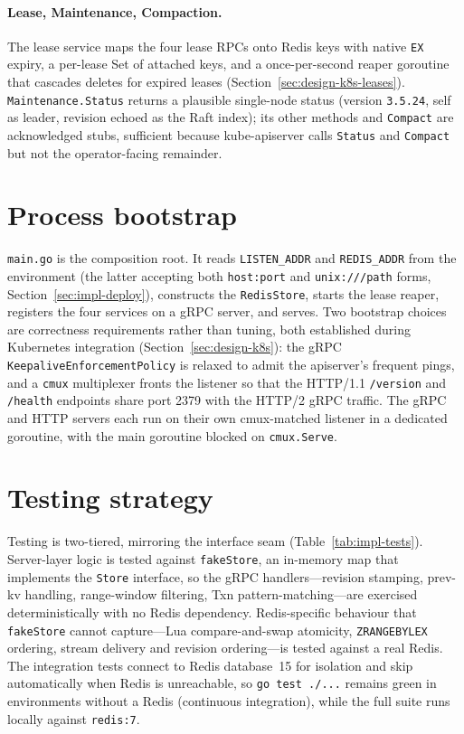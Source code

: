 \paragraph{Lease, Maintenance, Compaction.}
The lease service maps the four lease RPCs onto Redis keys with native \texttt{EX} expiry, a per-lease Set of attached keys, and a once-per-second reaper goroutine that cascades deletes for expired leases (Section~\ref{sec:design-k8s-leases}). \texttt{Maintenance.Status} returns a plausible single-node status (version \texttt{3.5.24}, self as leader, revision echoed as the Raft index); its other methods and \texttt{Compact} are acknowledged stubs, sufficient because kube-apiserver calls \texttt{Status} and \texttt{Compact} but not the operator-facing remainder.

\section{Process bootstrap}
\label{sec:impl-main}

\texttt{main.go} is the composition root. It reads \texttt{LISTEN\_ADDR} and \texttt{REDIS\_ADDR} from the environment (the latter accepting both \texttt{host:port} and \texttt{unix:///path} forms, Section~\ref{sec:impl-deploy}), constructs the \texttt{RedisStore}, starts the lease reaper, registers the four services on a gRPC server, and serves. Two bootstrap choices are correctness requirements rather than tuning, both established during Kubernetes integration (Section~\ref{sec:design-k8s}): the gRPC \texttt{KeepaliveEnforcementPolicy} is relaxed to admit the apiserver's frequent pings, and a \texttt{cmux} multiplexer fronts the listener so that the HTTP/1.1 \texttt{/version} and \texttt{/health} endpoints share port 2379 with the HTTP/2 gRPC traffic. The gRPC and HTTP servers each run on their own cmux-matched listener in a dedicated goroutine, with the main goroutine blocked on \texttt{cmux.Serve}.

\section{Testing strategy}
\label{sec:impl-testing}

Testing is two-tiered, mirroring the interface seam (Table~\ref{tab:impl-tests}). Server-layer logic is tested against \texttt{fakeStore}, an in-memory map that implements the \texttt{Store} interface, so the gRPC handlers---revision stamping, prev-kv handling, range-window filtering, Txn pattern-matching---are exercised deterministically with no Redis dependency. Redis-specific behaviour that \texttt{fakeStore} cannot capture---Lua compare-and-swap atomicity, \texttt{ZRANGEBYLEX} ordering, stream delivery and revision ordering---is tested against a real Redis. The integration tests connect to Redis database~15 for isolation and skip automatically when Redis is unreachable, so \texttt{go test ./...} remains green in environments without a Redis (continuous integration), while the full suite runs locally against \texttt{redis:7}.


